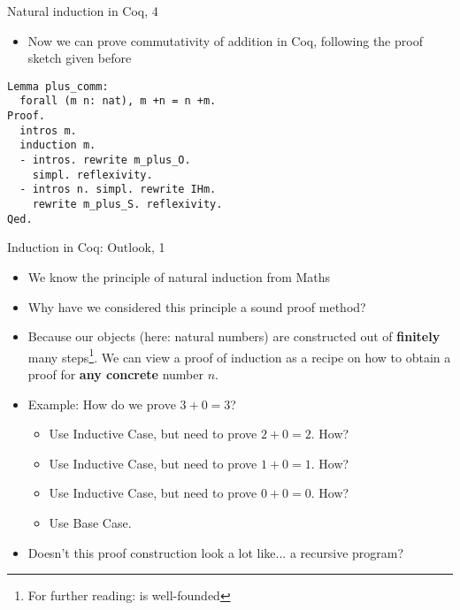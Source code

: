 \begin{frame}[fragile]{Natural induction in Coq, 4}
\begin{itemize}
  \item Now we can prove commutativity of addition in Coq, following the proof sketch given before
  \pause
\end{itemize}
\begin{lstlisting}
Lemma plus_comm:
  forall (m n: nat), m +n = n +m.
Proof.
  intros m.
  induction m.
  - intros. rewrite m_plus_O.
    simpl. reflexivity.
  - intros n. simpl. rewrite IHm.
    rewrite m_plus_S. reflexivity.
Qed.
\end{lstlisting}
\end{frame}

\begin{frame}[fragile]{Induction in Coq: Outlook, 1}
\begin{itemize}
  \item We know the principle of natural induction from Maths
  \pause
  \item Why have we considered this principle a sound proof method?
  \pause
  \item Because our objects (here: natural numbers) are constructed out of \textbf{finitely} many steps\footnote{For further reading:  is well-founded}. We can view a proof of induction as a recipe on how to obtain a proof for \textbf{any concrete} number $n$.
  \pause
  \item Example: How do we prove $3 + 0 = 3$?
    \begin{itemize}
      \item Use Inductive Case, but need to prove $2 + 0 = 2$. How?
      \item Use Inductive Case, but need to prove $1 + 0 = 1$. How?
      \item Use Inductive Case, but need to prove $0 + 0 = 0$. How?
      \item Use Base Case.
    \end{itemize}
  \pause
  \item Doesn't this proof construction look a lot like... a recursive program?
\end{itemize}
\end{frame}


